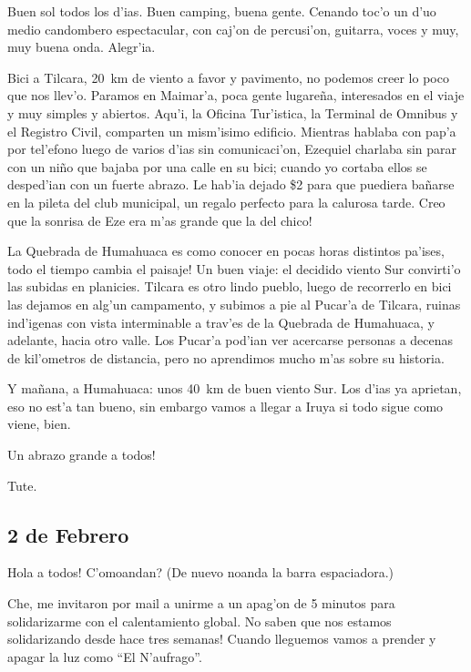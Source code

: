 Buen sol todos los d'ias. Buen camping, buena gente. Cenando toc'o un d'uo medio
candombero espectacular, con caj'on de percusi'on, guitarra, voces y muy, muy
buena onda. Alegr'ia.

Bici a Tilcara, 20~km de viento a favor y pavimento, no podemos creer lo poco
que nos llev'o. Paramos en Maimar'a, poca gente lugare\~na, interesados en el
viaje y muy simples y abiertos. Aqu'i, la Oficina Tur'istica, la Terminal de
Omnibus y el Registro Civil, comparten un mism'isimo edificio. Mientras hablaba
con pap'a por tel'efono luego de varios d'ias sin comunicaci'on, Ezequiel
charlaba sin parar con un ni\~no que bajaba por una calle en su bici; cuando yo
cortaba ellos se desped'ian con un fuerte abrazo. Le hab'ia dejado \$2 para que
puediera ba\~narse en la pileta del club municipal, un regalo perfecto para la
calurosa tarde. \textexclamdown Creo que la sonrisa de Eze era m'as grande que
la del chico!

La Quebrada de Humahuaca es como conocer en pocas horas distintos pa'ises,
\textexclamdown todo el tiempo cambia el paisaje! Un buen viaje: el decidido
viento Sur convirti'o las subidas en planicies. Tilcara es otro lindo pueblo,
luego de recorrerlo en bici las dejamos en alg'un campamento, y subimos a pie al
Pucar'a de Tilcara, ruinas ind'igenas con vista interminable a trav'es de la
Quebrada de Humahuaca, y adelante, hacia otro valle. Los Pucar'a pod'ian ver
acercarse personas a decenas de kil'ometros de distancia, pero no aprendimos
mucho m'as sobre su historia.

Y ma\~nana, a Humahuaca: unos 40~km de buen viento Sur. Los d'ias ya aprietan,
eso no est'a tan bueno, sin embargo vamos a llegar a Iruya si todo sigue como
viene, bien.

\textexclamdown Un abrazo grande a todos!

Tute.

\subsection*{2 de Febrero}

\textexclamdown Hola a todos! \textquestiondown C'omoandan? (De nuevo noanda la
barra espaciadora.)

Che, me invitaron por mail a unirme a un apag'on de 5 minutos para solidarizarme
con el calentamiento global. \textexclamdown No saben que nos estamos
solidarizando desde hace tres semanas! Cuando lleguemos vamos a prender y apagar
la luz como ``El N'aufrago''.

